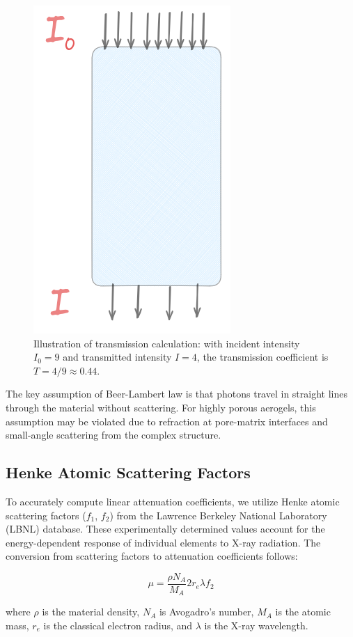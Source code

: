 \documentclass[twocolumn]{aastex701}
\begin{document}
\begin{figure}[t]
    \centering
    \includegraphics[width=0.45\linewidth]{intensity.png}
    \caption{Illustration of transmission calculation: with incident intensity $I_0 = 9$ and transmitted intensity $I = 4$, the transmission coefficient is $T = 4/9 \approx 0.44$.}
    \label{fig:nntensity}
\end{figure}

The key assumption of Beer-Lambert law is that photons travel in straight lines through the material without scattering. For highly porous aerogels, this assumption may be violated due to refraction at pore-matrix interfaces and small-angle scattering from the complex structure.

\subsection{Henke Atomic Scattering Factors}

To accurately compute linear attenuation coefficients, we utilize Henke atomic scattering factors ($f_1$, $f_2$) from the Lawrence Berkeley National Laboratory (LBNL) database. These experimentally determined values account for the energy-dependent response of individual elements to X-ray radiation. The conversion from scattering factors to attenuation coefficients follows:

\begin{equation}
\label{eq: f2 to mu}
    \mu = \frac{\rho N_A}{M_A} 2 r_e \lambda f_2
\end{equation}

where $\rho$ is the material density, $N_A$ is Avogadro's number, $M_A$ is the atomic mass, $r_e$ is the classical electron radius, and $\lambda$ is the X-ray wavelength.
\end{document}
